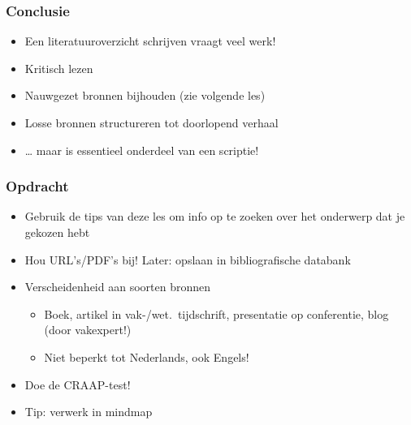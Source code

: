 \documentclass[aspectratio=169]{beamer}
\begin{document}
\begin{frame}
  \frametitle{Conclusie}

  \begin{itemize}
    \item Een literatuuroverzicht schrijven vraagt veel werk!
    \item Kritisch lezen
    \item Nauwgezet bronnen bijhouden (zie volgende les)
    \item Losse bronnen structureren tot doorlopend verhaal
    \item \ldots{} maar is essentieel onderdeel van een scriptie!
  \end{itemize}

\end{frame}

\begin{frame}
  \frametitle{Opdracht}

  \begin{itemize}
    \item Gebruik de tips van deze les om info op te zoeken over het onderwerp dat je gekozen hebt
    \item Hou URL's/PDF's bij! Later: opslaan in bibliografische databank
    \item Verscheidenheid aan soorten bronnen
          \begin{itemize}
            \item Boek, artikel in vak-/wet.\ tijdschrift, presentatie op conferentie, blog (door vakexpert!)
            \item Niet beperkt tot Nederlands, ook Engels!
          \end{itemize}
    \item Doe de CRAAP-test!
    \item Tip: verwerk in mindmap
  \end{itemize}

\end{frame}
\end{document}
